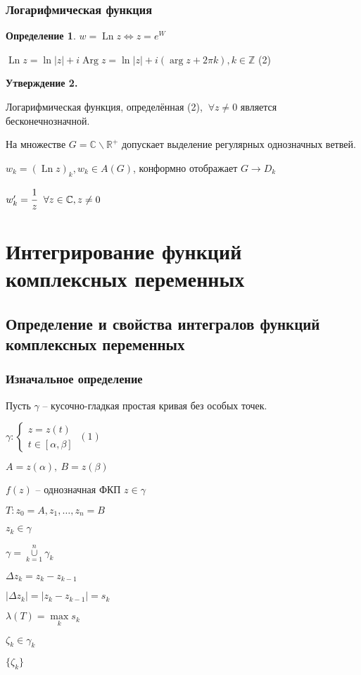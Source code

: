 \documentclass[final]{report}
\newcommand{\R}{\mathbb{R}}
\newcommand{\Z}{\mathbb{Z}}
\renewcommand{\C}{\mathbb{C}}
\newcommand{\LRA}{\Leftrightarrow}
\newcommand{\Ln}{\mathop{\mathrm{Ln}}\nolimits}
\newcommand{\Arg}{\mathop{\mathrm{Arg}}\nolimits}
\renewcommand{\a}{\alpha}
\renewcommand{\b}{\beta}
\newcommand{\g}{\gamma}
\renewcommand{\l}{\lambda}
\newcommand{\D}{\Delta}
\newcommand{\F}{\ \forall}
\newcommand{\sys}[1]{\left\{\begin{matrix}#1\end{matrix}\right.}
\newcommand{\opr}[1]{\begin{opred}#1\end{opred}}
\newtheorem*{opred}{Определение}
\theoremstyle{remark}
\begin{document}
\subsection{Логарифмическая функция}

\opr{$w=\Ln z \LRA z=e^W$}

$\Ln z=\ln|z|+i\Arg z=\ln |z|+i(\arg z+2\pi k), k\in\Z$ (2)

{\bfseries Утверждение 2.}

Логарифмическая функция, определённая (2), $\F z\neq0$ является бесконечнозначной.

На множестве $G=\C\smallsetminus\R^+$ допускает выделение регулярных однозначных ветвей.

$w_k=(\Ln z)_k, w_k\in A(G)$, конформно отображает $G\to D_k$

$w_k'=\cfrac 1z\ \F z\in\C, z\neq0$

\chapter{Интегрирование функций комплексных переменных}

\newpage

\section{Определение и свойства интегралов функций комплексных переменных}

\subsection{Изначальное определение}

Пусть $\g$ -- кусочно-гладкая простая кривая без особых точек.

$\g\colon\sys{z=z(t)\\t\in[\a,\b]}\ (1)$

$A=z(\a),\ B=z(\b)$

$f(z)$ -- однозначная ФКП $z\in\g$

$T\colon z_0=A,z_1,\ldots,z_n=B$

$z_k\in\g$

$\g=\overset{n}{\underset{k=1}{\cup}}\g_k$

$\D z_k=z_k-z_{k-1}$

$|\D z_k|=|z_k-z_{k-1}|=s_k$

$\l(T)=\underset{k}{\max}s_k$

$\zeta_k\in\g_k$

$\{\zeta_k\}$
\end{document}
